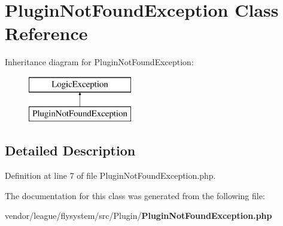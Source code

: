 \section{Plugin\+Not\+Found\+Exception Class Reference}
\label{class_league_1_1_flysystem_1_1_plugin_1_1_plugin_not_found_exception}
Inheritance diagram for Plugin\+Not\+Found\+Exception\+:\begin{figure}[H]
\begin{center}
\leavevmode
\includegraphics[height=2.000000cm]{class_league_1_1_flysystem_1_1_plugin_1_1_plugin_not_found_exception}
\end{center}
\end{figure}


\subsection{Detailed Description}


Definition at line 7 of file Plugin\+Not\+Found\+Exception.\+php.



The documentation for this class was generated from the following file\+:\begin{DoxyCompactItemize}
\item 
vendor/league/flysystem/src/\+Plugin/{\bf Plugin\+Not\+Found\+Exception.\+php}\end{DoxyCompactItemize}
